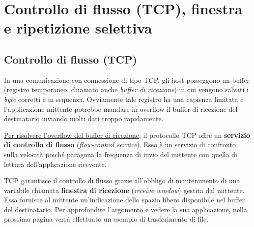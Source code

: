 \documentclass[a4paper]{article}
\begin{document}
	\newpage
	
	\section{Controllo di flusso (TCP), finestra e ripetizione selettiva}
	
	\subsection{Controllo di flusso (TCP)}
	
	In una comunicazione con connessione di tipo TCP, gli host posseggono un buffer (registro temporaneo, chiamato anche \emph{buffer di ricezione}) in cui vengono salvati i \emph{byte} corretti e in sequenza. Ovviamente tale registro ha una capienza limitata e l’applicazione mittente potrebbe mandare in overflow il buffer di ricezione del destinatario inviando molti dati troppo rapidamente.\newline
	
	\noindent
	\underline{Per risolvere l’overflow del buffer di ricezione}, il protocollo TCP offre un \textcolor{Red3}{\textbf{servizio di controllo di flusso}} (\emph{flow-control service}). Esso è un servizio di confronto sulla velocità poiché paragona la frequenza di invio del mittente con quella di lettura dell’applicazione ricevente.\newline
	
	\noindent
	\newline
	\:\newline
	
	\noindent
	TCP garantisce il controllo di flusso grazie all’obbligo di mantenimento di una variabile chiamata \textcolor{Red3}{\textbf{finestra di ricezione}} (\emph{receive window}) gestita dal mittente. Essa fornisce al mittente un’indicazione dello spazio libero disponibile nel buffer del destinatario. Per approfondire l’argomento e vedere la sua applicazione, nella prossima pagina verrà effettuato un esempio di trasferimento di file.
	\newpage
	
\end{document}
